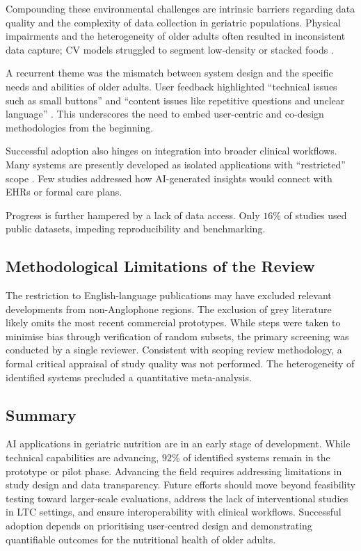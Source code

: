Compounding these environmental challenges are intrinsic barriers regarding data quality and the complexity of data collection in geriatric populations. Physical impairments and the heterogeneity of older adults often resulted in inconsistent data capture; CV models struggled to segment low-density or stacked foods \citep{pfistererEnhancingFoodIntake2022}.

A recurrent theme was the mismatch between system design and the specific needs and abilities of older adults. User feedback highlighted ``technical issues such as small buttons'' and ``content issues like repetitive questions and unclear language'' \citep{balsaUsabilityIntelligentVirtual2020}. This underscores the need to embed user-centric and co-design methodologies from the beginning.

Successful adoption also hinges on integration into broader clinical workflows. Many systems are presently developed as isolated applications with ``restricted'' scope \citep{chopraDigiMateLeveragingLarge2024}. Few studies addressed how AI-generated insights would connect with EHRs or formal care plans.

Progress is further hampered by a lack of data access. Only $16\%$ of studies used public datasets, impeding reproducibility and benchmarking.

\subsection{Methodological Limitations of the Review}

The restriction to English-language publications may have excluded relevant developments from non-Anglophone regions. The exclusion of grey literature likely omits the most recent commercial prototypes. While steps were taken to minimise bias through verification of random subsets, the primary screening was conducted by a single reviewer. Consistent with scoping review methodology, a formal critical appraisal of study quality was not performed. The heterogeneity of identified systems precluded a quantitative meta-analysis.

\subsection{Summary}

AI applications in geriatric nutrition are in an early stage of development. While technical capabilities are advancing, $92\%$ of identified systems remain in the prototype or pilot phase. Advancing the field requires addressing limitations in study design and data transparency. Future efforts should move beyond feasibility testing toward larger-scale evaluations, address the lack of interventional studies in LTC settings, and ensure interoperability with clinical workflows. Successful adoption depends on prioritising user-centred design and demonstrating quantifiable outcomes for the nutritional health of older adults.

